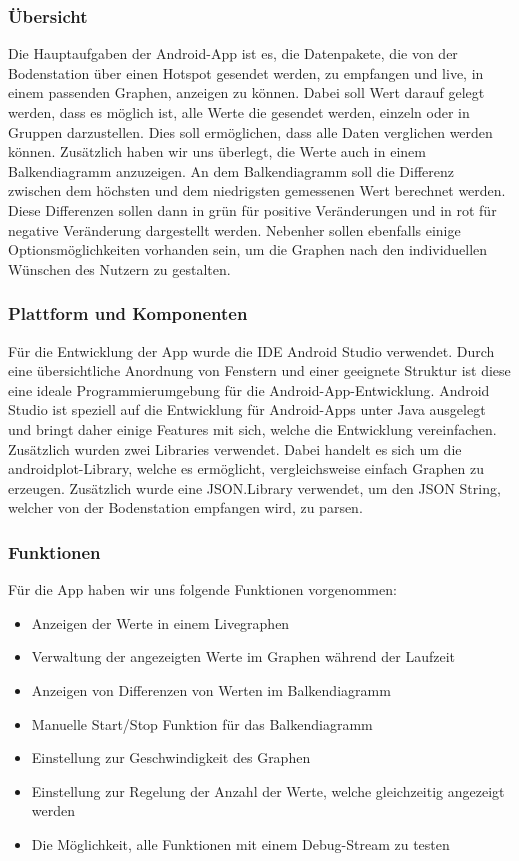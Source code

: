 \subsubsection{Übersicht}
Die Hauptaufgaben der Android-App ist es, die Datenpakete, die von der Bodenstation über einen Hotspot gesendet werden, zu empfangen und live, in einem passenden Graphen, anzeigen zu können. Dabei soll Wert darauf gelegt werden, dass es möglich ist, alle Werte die gesendet werden, einzeln oder in Gruppen darzustellen. Dies soll ermöglichen, dass alle Daten verglichen werden können. Zusätzlich haben wir uns überlegt, die Werte auch in einem Balkendiagramm anzuzeigen. An dem Balkendiagramm soll die Differenz zwischen dem höchsten und dem niedrigsten gemessenen Wert berechnet werden. Diese Differenzen sollen dann in grün für positive Veränderungen und in rot für negative Veränderung dargestellt werden. Nebenher sollen ebenfalls einige Optionsmöglichkeiten vorhanden sein, um die Graphen nach den individuellen Wünschen des Nutzern zu gestalten.

\subsubsection{Plattform und Komponenten}
Für die Entwicklung der App wurde die IDE Android Studio verwendet. Durch eine übersichtliche Anordnung von Fenstern und einer geeignete Struktur ist diese eine ideale Programmierumgebung für die Android-App-Entwicklung. Android Studio ist speziell auf die Entwicklung für Android-Apps unter Java ausgelegt und bringt daher einige Features mit sich, welche die Entwicklung vereinfachen. Zusätzlich wurden zwei Libraries verwendet. Dabei handelt es sich um die androidplot-Library, welche es ermöglicht, vergleichsweise einfach Graphen zu erzeugen. Zusätzlich wurde eine JSON.Library verwendet, um den JSON String, welcher von der Bodenstation empfangen wird, zu parsen.
\subsubsection{Funktionen}
Für die App haben wir uns folgende Funktionen vorgenommen:
\begin{itemize}
	\item Anzeigen der Werte in einem Livegraphen
	\item Verwaltung der angezeigten Werte im Graphen während der Laufzeit
	\item Anzeigen von Differenzen von Werten im Balkendiagramm
	\item Manuelle Start/Stop Funktion für das Balkendiagramm
	\item Einstellung zur Geschwindigkeit des Graphen
	\item Einstellung zur Regelung der Anzahl der Werte, welche gleichzeitig angezeigt werden
	\item Die Möglichkeit, alle Funktionen mit einem Debug-Stream zu testen
\end{itemize}

